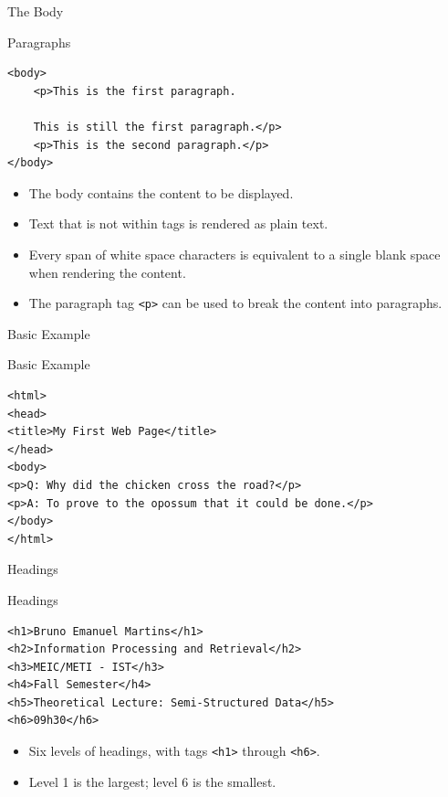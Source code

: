 \documentclass[svgnames]{beamer}
\begin{document}
\begin{frame}[fragile]{The Body}
\small
\begin{block}{Paragraphs}
\begin{verbatim}
<body>
    <p>This is the first paragraph.

    This is still the first paragraph.</p>
    <p>This is the second paragraph.</p>
</body>
\end{verbatim}
\end{block}
\normalsize
\begin{itemize}
	\item The body contains the content to be displayed.
	\item Text that is not within tags is rendered as plain text.
	\item Every span of white space characters is equivalent to a single blank space when rendering the content.
	\item The paragraph tag \texttt{<p>} can be used to break the content into paragraphs.
\end{itemize}
\end{frame}

\begin{frame}[fragile]{Basic Example}
\begin{block}{Basic Example}
\small
\begin{verbatim}
<html>
<head>
<title>My First Web Page</title>
</head>
<body>
<p>Q: Why did the chicken cross the road?</p>
<p>A: To prove to the opossum that it could be done.</p>
</body>
</html>
\end{verbatim}
\normalsize
\end{block}
\end{frame}

\begin{frame}[fragile]{Headings}
\small
\begin{block}{Headings}
\begin{verbatim}
<h1>Bruno Emanuel Martins</h1>
<h2>Information Processing and Retrieval</h2>
<h3>MEIC/METI - IST</h3>
<h4>Fall Semester</h4>
<h5>Theoretical Lecture: Semi-Structured Data</h5>
<h6>09h30</h6>
\end{verbatim}
\end{block}
\normalsize
\begin{itemize}
	\item Six levels of headings, with tags \texttt{<h1>} through \texttt{<h6>}.
	\item Level 1 is the largest; level 6 is the smallest.
\end{itemize}
\end{frame}
\end{document}

